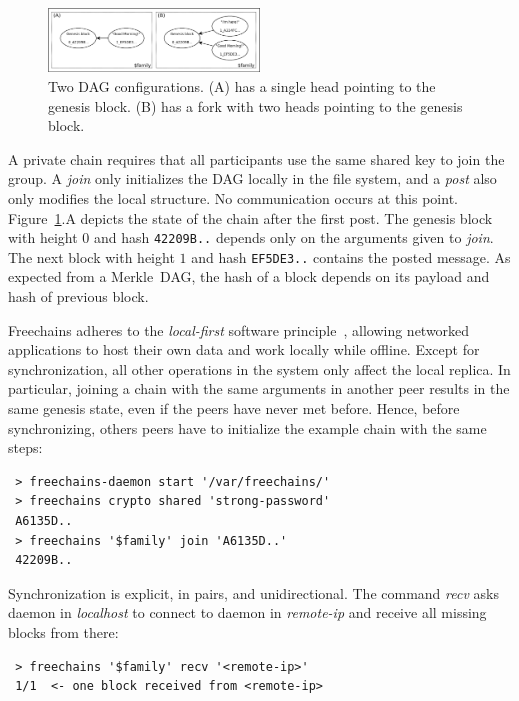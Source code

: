 \documentclass[10pt,journal,compsoc]{IEEEtran}
\newcommand{\FC}       {Freechains\xspace}
\begin{document}
\begin{figure}
\centering
\includegraphics[width=0.5\textwidth]{family.png}
\caption{Two DAG configurations. (A) has a single head pointing to the
genesis block. (B) has a fork with two heads pointing to the genesis block.}
\label{fig.family}
\end{figure}

A private chain requires that all participants use the same shared key to join
the group.
A \emph{join} only initializes the DAG locally in the file system, and a
\emph{post} also only modifies the local structure.
No communication occurs at this point.
Figure~\ref{fig.family}.A depicts the state of the chain after the first post.
The genesis block with height $0$ and hash \texttt{42209B..}
depends only on the arguments given to \emph{join}.
The next block with height $1$ and hash \texttt{EF5DE3..} contains the posted
message.
As expected from a Merkle~DAG, the hash of a block depends on its payload and
hash of previous block.

\FC adheres to the \emph{local-first} software principle~\cite{p2p.local},
allowing networked applications to host their own data and work locally while
offline.
Except for synchronization, all other operations in the system only affect the
local replica.
In particular, joining a chain with the same arguments in another peer results
in the same genesis state, even if the peers have never met before.
Hence, before synchronizing, others peers have to initialize the example chain
with the same steps:

{\footnotesize
\begin{verbatim}
 > freechains-daemon start '/var/freechains/'
 > freechains crypto shared 'strong-password'
 A6135D..
 > freechains '$family' join 'A6135D..'
 42209B..
\end{verbatim}
}

Synchronization is explicit, in pairs, and unidirectional.
The command \emph{recv} asks daemon in \emph{localhost} to connect to daemon in
\emph{remote-ip} and receive all missing blocks from there:

{\footnotesize
\begin{verbatim}
 > freechains '$family' recv '<remote-ip>'
 1/1  <- one block received from <remote-ip>
\end{verbatim}
}
\end{document}
